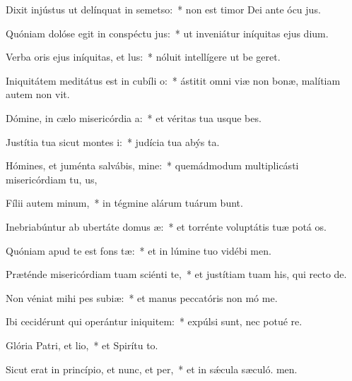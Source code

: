 \item Dixit injústus ut delínquat in semetso:~* non est timor Dei ante ócu jus.
\item Quóniam dolóse egit in conspéctu jus:~* ut inveniátur iníquitas ejus  dium.
\item Verba oris ejus iníquitas, et lus:~* nóluit intellígere ut be geret.
\item Iniquitátem meditátus est in cubíli o:~* ástitit omni viæ non bonæ, malítiam autem non vit.
\item Dómine, in cælo misericórdia a:~* et véritas tua usque  bes.
\item Justítia tua sicut montes i:~* judícia tua abýs ta.
\item Hómines, et juménta salvábis, mine:~* quemádmodum multiplicásti misericórdiam tu, us,
\item Fílii autem minum,~* in tégmine alárum tuárum bunt.
\item Inebriabúntur ab ubertáte domus æ:~* et torrénte voluptátis tuæ potá os.
\item Quóniam apud te est fons tæ:~* et in lúmine tuo vidébi men.
\item Præténde misericórdiam tuam sciénti te,~* et justítiam tuam his, qui recto  de.
\item Non véniat mihi pes subiæ:~* et manus peccatóris non mó me.
\item Ibi cecidérunt qui operántur iniquitem:~* expúlsi sunt, nec potué re.
\item Glória Patri, et lio,~* et Spirítu to.
\item Sicut erat in princípio, et nunc, et per,~* et in sǽcula sæculó. men.
